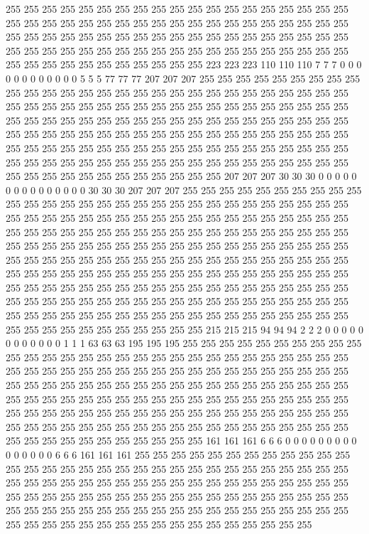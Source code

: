 255 255 255 255 255 255 255 255 255 255 255 255 255 255 255 255 255 255 255 255 255 255 255 255 255 255 255 255 255 255 255 255 255 255 255 255 255 255 255 255 255 255 255 255 255 255 255 255 255 255 255 255 255 255 255 255 255 255 255 255 255 255 255 255 255 255 255 255 255 255 255 255 255 255 255 255 255 255 255 255 255 255 255 255 255 255 255 223 223 223 110 110 110 7 7 7 0 0 0 0 0 0 0 0 0 0 0 0 5 5 5 77 77 77 207 207 207 255 255 255 255 255 255 255 255 255 255 255 
255 255 255 255 255 255 255 255 255 255 255 255 255 255 255 255 255 255 255 255 255 255 255 255 255 255 255 255 255 255 255 255 255 255 255 255 255 255 255 255 255 255 255 255 255 255 255 255 255 255 255 255 255 255 255 255 255 255 255 255 255 255 255 255 255 255 255 255 255 255 255 255 255 255 255 255 255 255 255 255 255 255 255 255 255 255 255 255 255 255 255 255 255 255 255 255 255 255 255 255 255 255 255 255 255 255 255 255 255 255 255 255 255 255 255 255 255 255 255 255 255 255 255 255 207 207 207 30 
30 30 0 0 0 0 0 0 0 0 0 0 0 0 0 0 0 30 30 30 207 207 207 255 255 255 255 255 255 255 255 255 255 255 255 255 255 255 255 255 255 255 255 255 255 255 255 255 255 255 255 255 255 255 255 255 255 255 255 255 255 255 255 255 255 255 255 255 255 255 255 255 255 255 255 255 255 255 255 255 255 255 255 255 255 255 255 255 255 255 255 255 255 255 255 255 255 255 255 255 255 255 255 255 255 255 255 255 255 255 255 255 255 255 255 255 255 255 255 255 255 255 255 255 255 255 255 255 
255 255 255 255 255 255 255 255 255 255 255 255 255 255 255 255 255 255 255 255 255 255 255 255 255 255 255 255 255 255 255 255 255 255 255 255 255 255 255 255 255 255 255 255 255 255 255 255 255 255 255 255 255 255 255 255 255 255 255 255 255 255 255 255 255 255 255 255 255 255 255 255 255 255 255 255 255 255 255 255 255 255 255 255 255 255 255 215 215 215 94 94 94 2 2 2 0 0 0 0 0 0 0 0 0 0 0 0 1 1 1 63 63 63 195 195 195 255 255 255 255 255 255 255 255 255 255 255 
255 255 255 255 255 255 255 255 255 255 255 255 255 255 255 255 255 255 255 255 255 255 255 255 255 255 255 255 255 255 255 255 255 255 255 255 255 255 255 255 255 255 255 255 255 255 255 255 255 255 255 255 255 255 255 255 255 255 255 255 255 255 255 255 255 255 255 255 255 255 255 255 255 255 255 255 255 255 255 255 255 255 255 255 255 255 255 255 255 255 255 255 255 255 255 255 255 255 255 255 255 255 255 255 255 255 255 255 255 255 255 255 255 255 255 255 255 255 255 255 255 255 255 255 161 161 161 6 
6 6 0 0 0 0 0 0 0 0 0 0 0 0 0 0 0 6 6 6 161 161 161 255 255 255 255 255 255 255 255 255 255 255 255 255 255 255 255 255 255 255 255 255 255 255 255 255 255 255 255 255 255 255 255 255 255 255 255 255 255 255 255 255 255 255 255 255 255 255 255 255 255 255 255 255 255 255 255 255 255 255 255 255 255 255 255 255 255 255 255 255 255 255 255 255 255 255 255 255 255 255 255 255 255 255 255 255 255 255 255 255 255 255 255 255 255 255 255 255 255 255 255 255 255 255 255 255 
